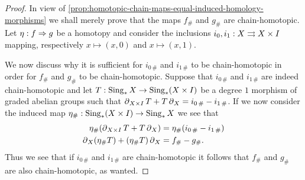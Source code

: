 \begin{proof}
In view of \cref{prop:homotopic-chain-maps-equal-induced-homology-morphisms} we
shall merely prove that the maps \(f_{\#}\) and \(g_{\#}\) are
chain-homotopic. Let \(\eta: f \Rightarrow g\) be a homotopy and consider the
inclusions \(i_0, i_1: X \rightrightarrows X \times I\) mapping, respectively
\(x \mapsto (x, 0)\) and \(x \mapsto (x, 1)\).

We now discuss why it is sufficient for \(i_{0\, \#}\) and \(i_{1\, \#}\) to be
chain-homotopic in order for \(f_{\#}\) and \(g_{\#}\) to be
chain-homotopic. Suppose that \(i_{0\, \#}\) and \(i_{1\, \#}\) are indeed
chain-homotopic and let \(T: \operatorname{Sing}_{*} X \to \operatorname{Sing}_{*}(X \times I)\) be a degree
\(1\) morphism of graded abelian groups such that
\(\operatorname{\partial}_{X \times I} T + T \operatorname{\partial}_X = i_{0\, \#} - i_{1\, \#}\). If we now consider
the induced map \(\eta_{\#}: \operatorname{Sing}_{*}(X \times I) \to \operatorname{Sing}_{*} X\) we see that
\begin{align*}
  \eta_{\#} (\operatorname{\partial}_{X \times I} T + T \operatorname{\partial}_X)
  &= \eta_{\#} (i_{0\, \#} - i_{1\, \#})
  \\
  \operatorname{\partial}_X (\eta_{\#} T) + (\eta_{\#} T) \operatorname{\partial}_X
  &= f_{\#} - g_{\#}.
\end{align*}
Thus we see that if \(i_{0\, \#}\) and \(i_{1\, \#}\) are chain-homotopic it
follows that \(f_{\#}\) and \(g_{\#}\) are also chain-homotopic, as wanted.


\end{proof}
